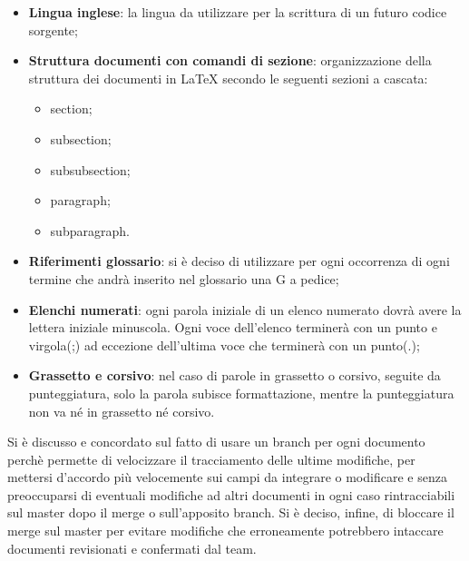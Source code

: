 \begin{itemize}
\item \textbf{Lingua inglese}: la lingua da utilizzare per la scrittura di un futuro codice sorgente;
\item \textbf{Struttura documenti con comandi di sezione}: organizzazione della struttura dei documenti in \LaTeX{} secondo le seguenti sezioni a cascata:
\begin{itemize}
	\item section;
	\item subsection;
	\item subsubsection;
	\item paragraph;
	\item subparagraph.
\end{itemize}
\item \textbf{Riferimenti glossario}: si è deciso di utilizzare per ogni occorrenza di ogni termine che andrà inserito nel glossario una G a pedice;
\item \textbf{Elenchi numerati}: ogni parola iniziale di un elenco numerato dovrà avere la lettera iniziale minuscola. Ogni voce dell'elenco terminerà con un punto e virgola(;) ad eccezione dell'ultima voce che terminerà con un punto(.);
\item \textbf{Grassetto e corsivo}: nel caso di parole in grassetto o corsivo, seguite da punteggiatura, solo la parola subisce formattazione, mentre la punteggiatura non va né in grassetto né corsivo.
\end{itemize}
Si è discusso e concordato sul fatto di usare un branch per ogni documento perchè permette di velocizzare il tracciamento delle ultime modifiche, per mettersi d'accordo più velocemente sui campi da integrare o modificare e senza preoccuparsi di eventuali modifiche ad altri documenti in ogni caso rintracciabili sul master dopo il merge o sull'apposito branch. Si è deciso, infine, di bloccare il merge sul master per evitare modifiche che erroneamente potrebbero intaccare documenti revisionati e confermati dal team.
\pagebreak
